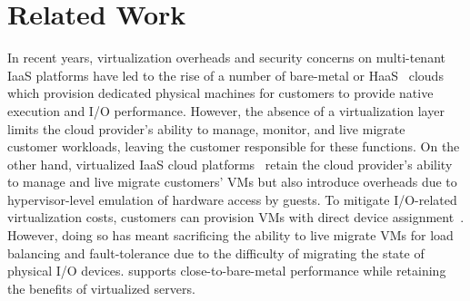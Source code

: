 
\section{Related Work}
In recent years, virtualization overheads and security concerns on 
multi-tenant IaaS platforms have led to the rise of a 
number of bare-metal or HaaS~\cite{softlayer,oracle,zenlayer,vultr,m2}
clouds which provision dedicated physical machines for customers
to provide native execution and I/O performance.
However, the absence of a virtualization layer 
limits the cloud provider's ability to manage, monitor, 
and live migrate~\cite{clark:2005,postcopy-osr}
customer workloads, leaving the customer responsible for 
these functions.
On the other hand, virtualized IaaS cloud platforms~\cite{gcp,azure,ec2}
retain the cloud provider's ability to manage and live migrate customers'
VMs but also introduce overheads  due to
hypervisor-level emulation of hardware access by guests. To mitigate I/O-related 
virtualization costs, customers can provision VMs with 
direct device assignment~\cite{intelvtd-paper,intelvtd-manual}. 
However, doing so has meant sacrificing the ability 
to live migrate VMs for load balancing and fault-tolerance
due to the difficulty of migrating the state of physical I/O devices.
\na supports close-to-bare-metal performance
while retaining the benefits of virtualized servers.

